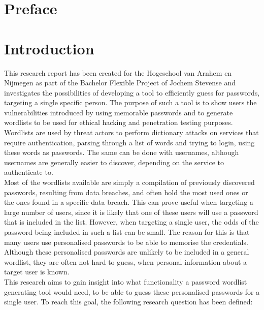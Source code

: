 \documentclass[a4paper,12pt]{article}
\begin{document}
\section*{Preface}
\newpage
  
\tableofcontents

\newpage
\section{Introduction}
\label{ch:intro}
This research report has been created for the Hogeschool van Arnhem en Nijmegen as part of the Bachelor Flexible Project of Jochem Stevense and investigates the possibilities of developing a tool to efficiently guess for passwords, targeting a single specific person. The purpose of such a tool is to show users the vulnerabilities introduced by using memorable passwords and to generate wordlists to be used for ethical hacking and penetration testing purposes.\\

Wordlists are used by threat actors to perform dictionary attacks on services that require authentication, parsing through a list of words and trying to login, using these words as passwords. The same can be done with usernames, although usernames are generally easier to discover, depending on the service to authenticate to.\\
Most of the wordlists available are simply a compilation of previously discovered passwords, resulting from data breaches, and often hold the most used ones or the ones found in a specific data breach. This can prove useful when targeting a large number of users, since it is likely that one of these users will use a password that is included in the list. However, when targeting a single user, the odds of the password being included in such a list can be small. The reason for this is that many users use personalised passwords to be able to memorise the credentials. Although these personalised passwords are unlikely to be included in a general wordlist, they are often not hard to guess, when personal information about a target user is known.\\
This research aims to gain insight into what functionality a password wordlist generating tool would need, to be able to guess these personalised passwords for a single user. To reach this goal, the following research question has been defined:\\
\end{document}
